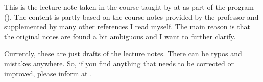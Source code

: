 \begin{myminipage} 
     This is the lecture note taken in the course \textit{\courseloc} taught by \profloc{} at \instituteloc{} as part of the \classloc{} program (\sessionloc).
     The content is partly based on the course notes provided by the professor and supplemented by many other references I read myself. The main reason is that the original notes are found a bit ambiguous
     and I want to further clarify.

     Currently, these are just drafts of the lecture notes. There can be typos and mistakes anywhere. So, if you find anything that needs to be corrected or improved, please inform at \myemailloc. \bigskip

\end{myminipage}
